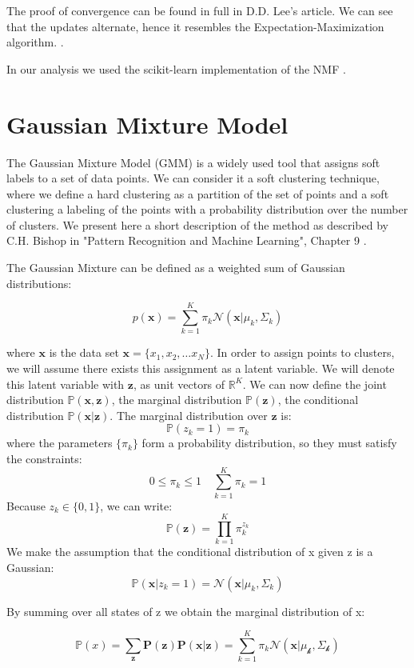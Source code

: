 The proof of convergence can be found in full in D.D. Lee's article. We can see that the updates alternate, hence it resembles the Expectation-Maximization algorithm. \cite{Lee2000}.

In our analysis we used the scikit-learn implementation of the NMF \cite{sklearn2011,Cichocki2009}.

\section{Gaussian Mixture Model}
\label{sec:gmm}

The Gaussian Mixture Model (GMM) is a widely used tool that assigns soft labels to a set of data points. We can consider it a soft clustering technique, where we define a hard clustering as a partition of the set of points and a soft clustering a labeling of the points with a probability distribution over the number of clusters.
We present here a short description of the method as described by C.H. Bishop in "Pattern Recognition and Machine Learning", Chapter 9 \cite{bishop2006pattern}.

The Gaussian Mixture can be defined as a weighted sum of Gaussian distributions:

$$ p(\mathbf{x}) = \sum_{k=1}^{K}\pi_k \mathcal{N}(\mathbf{x} | \mu_k, \Sigma_k) $$

where $\mathbf{x}$ is the data set $\mathbf{x} = \{x_1, x_2, \dots x_N\}$. In order to assign points to clusters, we will assume there exists this assignment as a latent variable. We will denote this latent variable with $\mathbf{z}$, as unit vectors of $\mathbb{R}^K$. We can now define the joint distribution $\mathbb{P}(\mathbf{x},\mathbf{z})$, the marginal distribution $\mathbb{P}(\mathbf{z})$, the conditional distribution $\mathbb{P}(\mathbf{x}|\mathbf{z})$. The marginal distribution over $\mathbf{z}$ is:
$$\mathbb{P}(z_k = 1) = \pi_k$$
where the parameters $\{\pi_k\}$ form a probability distribution, so they must satisfy the constraints:
$$0 \le \pi_k \le 1 \quad \sum_{k=1}^{K}\pi_k = 1$$
Because $z_k \in \{0,1\}$, we can write:
$$\mathbb{P}(\mathbf{z}) = \prod_{k=1}^K \pi_k^{z_k}$$
We make the assumption that the conditional distribution of x given z is a Gaussian:
$$\mathbb{P}(\mathbf{x}|z_k = 1) = \mathcal{N}(\mathbf{x} | \mu_k, \Sigma_k)$$

By summing over all states of z we obtain the marginal distribution of x:

$$ \mathbb{P}(x) = \sum_{\mathbf{z}} \mathbf{P}(\mathbf{z})\mathbf{P}(\mathbf{x}|\mathbf{z}) = \sum_{k=1}^{K} \pi_k \mathcal{N(\mathbf{x}|\mu_k, \Sigma_k)}$$

